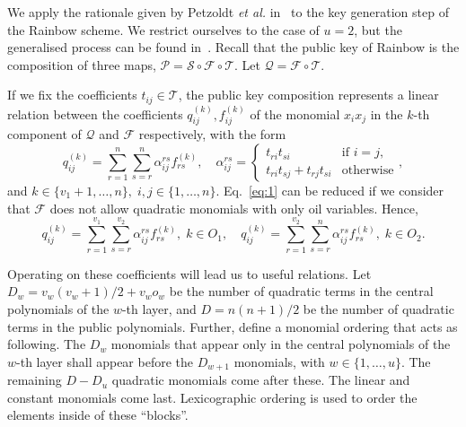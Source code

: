 \documentclass[a4paper, 14pt]{extarticle}
\begin{document}
We apply the rationale given by Petzoldt \emph{et al.} in~\cite{Petzoldt:inproc:2010:jun} to the key generation step of the Rainbow scheme. We restrict ourselves to the case of $u = 2$, but the generalised process can be found in~\cite[Section 7.2]{Petzoldt:phd:2013:jul}. Recall that the public key of Rainbow is the composition of three maps, $\mathcal{P} = \mathcal{S} \circ \mathcal{F} \circ \mathcal{T}$. Let $\mathcal{Q} = \mathcal{F} \circ \mathcal{T}$. 

If we fix the coefficients $t_{ij} \in \mathcal{T}$, the public key composition represents a linear relation between the coefficients $q_{ij}^{(k)}, f_{ij}^{(k)}$ of the monomial $x_{i} x_{j}$ in the $k$-th component of $\mathcal{Q}$ and $\mathcal{F}$ respectively, with the form
\begin{equation}\label{eq:1}
q_{ij}^{(k)} = \sum_{r = 1}^{n} \sum_{s = r}^{n} \alpha_{ij}^{rs} f_{rs}^{(k)}, \quad \alpha_{ij}^{rs} =
\begin{cases}
t_{ri} t_{si}                   & \text{if } i = j, \\
t_{ri} t_{sj} + t_{rj} t_{si}   & \text{otherwise}
\end{cases},
\end{equation}
and $k \in \{v_{1} + 1, \dots, n\}, \; i, j \in \{1, \dots, n\}$. Eq.~\ref{eq:1} can be reduced if we consider that $\mathcal{F}$ does not allow quadratic monomials with only oil variables. Hence,
\begin{equation}\label{eq:2}
    q_{ij}^{(k)} = \sum_{r = 1}^{v_{1}} \sum_{s = r}^{v_{2}} \alpha_{ij}^{rs} f_{rs}^{(k)}, \; k \in O_{1}, \quad    q_{ij}^{(k)} = \sum_{r = 1}^{v_{2}} \sum_{s = r}^{n} \alpha_{ij}^{rs} f_{rs}^{(k)}, \; k \in O_{2}.
\end{equation}

Operating on these coefficients will lead us to useful relations. Let $D_{w} = v_{w}(v_{w} + 1)/2 + v_{w} o_{w}$ be the number of quadratic terms in the central polynomials of the $w$-th layer, and $D = n(n + 1)/2$ be the number of quadratic terms in the public polynomials. Further, define a monomial ordering that acts as following. The $D_{w}$ monomials that appear only in the central polynomials of the $w$-th layer shall appear before the $D_{w + 1}$ monomials, with $w \in \{1, \dots, u\}$. The remaining $D - D_{u}$ quadratic monomials come after these. The linear and constant monomials come last. Lexicographic ordering is used to order the elements inside of these ``blocks''.
\end{document}
